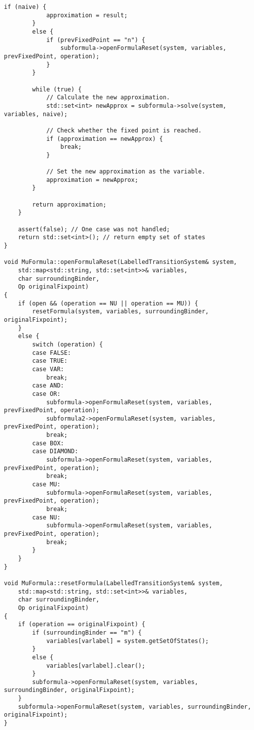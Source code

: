 \documentclass[10pt,a4paper]{article}
\begin{document}
\begin{lstlisting}[caption=MuCalculus.cpp]
        if (naive) {
            approximation = result;
        }
        else {
            if (prevFixedPoint == "n") {
                subformula->openFormulaReset(system, variables, prevFixedPoint, operation);
            }
        }

        while (true) {
            // Calculate the new approximation.
            std::set<int> newApprox = subformula->solve(system, variables, naive);
	
            // Check whether the fixed point is reached.
            if (approximation == newApprox) {
                break;
            }

            // Set the new approximation as the variable.
            approximation = newApprox;
        }

        return approximation;
    }

    assert(false); // One case was not handled;
    return std::set<int>(); // return empty set of states
}

void MuFormula::openFormulaReset(LabelledTransitionSystem& system, 
	std::map<std::string, std::set<int>>& variables, 
	char surroundingBinder, 
	Op originalFixpoint) 
{
    if (open && (operation == NU || operation == MU)) {
        resetFormula(system, variables, surroundingBinder, originalFixpoint);
    }
    else {
        switch (operation) {
        case FALSE:
        case TRUE:
        case VAR:
            break;
        case AND:
        case OR:
            subformula->openFormulaReset(system, variables, prevFixedPoint, operation);
            subformula2->openFormulaReset(system, variables, prevFixedPoint, operation);
            break;
        case BOX:
        case DIAMOND:
            subformula->openFormulaReset(system, variables, prevFixedPoint, operation);
            break;
        case MU:
            subformula->openFormulaReset(system, variables, prevFixedPoint, operation);
            break;
        case NU:
            subformula->openFormulaReset(system, variables, prevFixedPoint, operation);
            break;
        }
    }
}

void MuFormula::resetFormula(LabelledTransitionSystem& system, 
	std::map<std::string, std::set<int>>& variables, 
	char surroundingBinder, 
	Op originalFixpoint) 
{
    if (operation == originalFixpoint) {
        if (surroundingBinder == "m") {
            variables[varlabel] = system.getSetOfStates();
        }
        else {
            variables[varlabel].clear();
        }
        subformula->openFormulaReset(system, variables, surroundingBinder, originalFixpoint);
    }
    subformula->openFormulaReset(system, variables, surroundingBinder, originalFixpoint);
}


\end{lstlisting}
\end{document}
